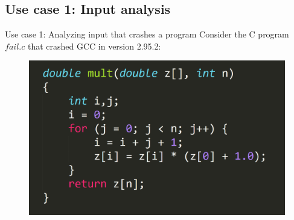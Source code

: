 \subsection{Use case 1: Input analysis}
\begin{frame}{Use case 1: Analyzing input that crashes a program}
	Consider the C program $fail.c$ that crashed GCC in version 2.95.2:


	\begin{figure}[h!]
		\includegraphics[width = .6\textwidth]{../figures/failC.PNG}
	\end{figure}
	
\end{frame}

